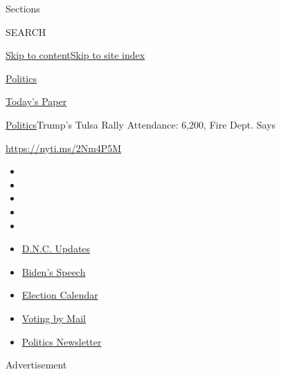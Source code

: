 Sections

SEARCH

\protect\hyperlink{site-content}{Skip to
content}\protect\hyperlink{site-index}{Skip to site index}

\href{https://www.nytimes3xbfgragh.onion/section/politics}{Politics}

\href{https://myaccount.nytimes3xbfgragh.onion/auth/login?response_type=cookie\&client_id=vi}{}

\href{https://www.nytimes3xbfgragh.onion/section/todayspaper}{Today's
Paper}

\href{/section/politics}{Politics}\textbar{}Trump's Tulsa Rally
Attendance: 6,200, Fire Dept. Says

\url{https://nyti.ms/2Nm4P5M}

\begin{itemize}
\item
\item
\item
\item
\item
\end{itemize}

\begin{itemize}
\item
  \href{https://www.nytimes3xbfgragh.onion/live/2020/08/20/us/dnc-convention-election?action=click\&pgtype=Article\&state=default\&region=TOP_BANNER\&context=storylines_menu}{D.N.C.
  Updates}
\item
  \href{https://www.nytimes3xbfgragh.onion/2020/08/20/us/politics/biden-presidential-nomination-dnc.html?action=click\&pgtype=Article\&state=default\&region=TOP_BANNER\&context=storylines_menu}{Biden's
  Speech}
\item
  \href{https://www.nytimes3xbfgragh.onion/interactive/2019/us/elections/2020-presidential-election-calendar.html?action=click\&pgtype=Article\&state=default\&region=TOP_BANNER\&context=storylines_menu}{Election
  Calendar}
\item
  \href{https://www.nytimes3xbfgragh.onion/interactive/2020/08/11/us/politics/vote-by-mail-us-states.html?action=click\&pgtype=Article\&state=default\&region=TOP_BANNER\&context=storylines_menu}{Voting
  by Mail}
\item
  \href{https://www.nytimes3xbfgragh.onion/newsletters/politics?action=click\&pgtype=Article\&state=default\&region=TOP_BANNER\&context=storylines_menu}{Politics
  Newsletter}
\end{itemize}

Advertisement

